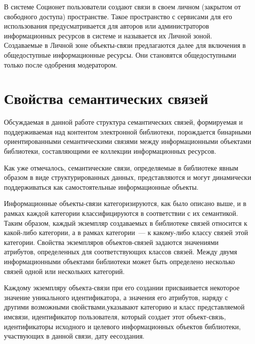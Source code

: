 \begin{multicols}{2}
  В системе Соционет пользователи создают связи в своем личном (закрытом 
от свободного доступа) пространстве. Такое пространство с сервисами для его 
использования предусматривается для авторов или администраторов 
информационных ресурсов в системе и называется их Личной зоной. 
Создаваемые в Личной зоне объек\-ты-свя\-зи предлагаются далее для 
включения в общедоступные информационные ресурсы. Они становятся 
общедоступными только после одобрения модератором. 

\section{Свойства семантических связей}

  Обсуждаемая в данной работе структура семантических связей, формируемая 
и поддерживаемая над контентом электронной библиотеки, по\-рож\-да\-ет\-ся 
бинарными ориентированными семантическими связями между 
информационными объектами библиотеки, составляющими ее коллекции 
информационных ресурсов. 
  
  Как уже отмечалось, семантические связи, опре\-де\-ля\-емые в библиотеке 
явным образом в виде структурированных данных, представляются и могут 
динамически поддерживаться как самостоятельные информационные объекты. 


Информационные объек\-ты-свя\-зи категоризируются, как было описано выше, 
и в рамках каж\-дой категории классифицируются в соответствии с их 
семантикой. Таким образом, каждый экземпляр со\-зда\-ва\-емых в библиотеке 
связей относится к ка\-кой-ли\-бо категории, а в рамках категории~--- к 
  ка\-ко\-му-ли\-бо классу связей этой категории. Свойства экземпляров 
  объек\-тов-свя\-зей задаются значениями атрибутов, определенных для 
соответствующих классов связей. Между двумя информационными объектами 
библиотеки может быть определено несколько связей одной или нескольких 
категорий.
{ %

}
  
  Каждому экземпляру объекта-связи при его создании присваивается 
некоторое значение уникального идентификатора, а значения его атрибутов, 
наряду с другими возможными свойствами,\linebreak указывают категорию и класс 
представляемой им\linebreak связи, идентификатор пользователя, который создает этот 
объект-связь, идентификаторы исходного и целевого информационных 
объектов биб\-лио\-теки, участвующих в данной связи, дату ее\linebreak со\-здания.
{ %

}
\end{multicols}

